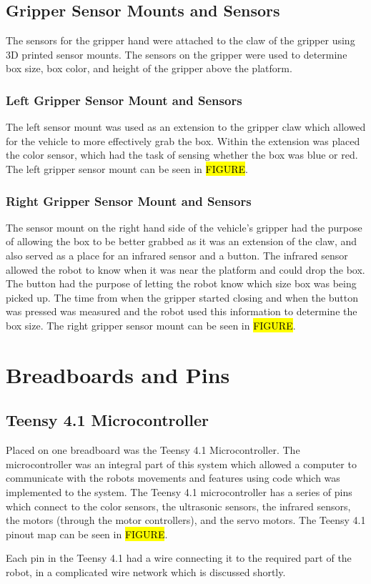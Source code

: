 \documentclass[11pt]{report}
\begin{document}
\subsection{Gripper Sensor Mounts and Sensors}
The sensors for the gripper hand were attached to the claw of the gripper using 3D printed sensor mounts. The sensors on the gripper were used to determine box size, box color, and height of the gripper above the platform. 
\subsubsection{Left Gripper Sensor Mount and Sensors}
The left sensor mount was used as an extension to the gripper claw which allowed for the vehicle to more effectively grab the box. Within the extension was placed the color sensor, which had the task of sensing whether the box was blue or red. The left gripper sensor mount can be seen in \hl{FIGURE}.
\subsubsection{Right Gripper Sensor Mount and Sensors}
The sensor mount on the right hand side of the vehicle’s gripper had the purpose of allowing the box to be better grabbed as it was an extension of the claw, and also served as a place for an infrared sensor and a button. The infrared sensor allowed the robot to know when it was near the platform and could drop the box. The button had the purpose of letting the robot know which size box was being picked up. The time from when the gripper started closing and when the button was pressed was measured and the robot used this information to determine the box size. The right gripper sensor mount can be seen in \hl{FIGURE}.

\section{Breadboards and Pins}
\subsection{Teensy 4.1 Microcontroller}
Placed on one breadboard was the Teensy 4.1 Microcontroller. The microcontroller was an integral part of this system which allowed a computer to communicate with the robots movements and features using code which was implemented to the system. The Teensy 4.1 microcontroller has a series of pins which connect to the color sensors, the ultrasonic sensors, the infrared sensors, the motors (through the motor controllers), and the servo motors. The Teensy 4.1 pinout map can be seen in \hl{FIGURE}. 
\par Each pin in the Teensy 4.1 had a wire connecting it to the required part of the robot, in a complicated wire network which is discussed shortly. 
\end{document}
